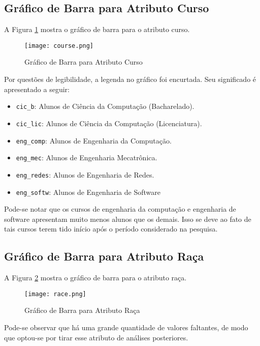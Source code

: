 \subsection{Gráfico de Barra para Atributo Curso}
A Figura \ref{atr_course} mostra o gráfico de barra para o atributo curso. 

\begin{figure}[!ht]
    \caption{Gráfico de Barra para Atributo Curso}
    \centering
    \texttt{[image: course.png]}
    \label{atr_course}
\end{figure}

Por questões de legibilidade, a legenda no gráfico foi encurtada. Seu significado é
apresentado a seguir: 
\begin{itemize}
    \item \texttt{cic\_b}: Alunos de Ciência da Computação (Bacharelado).
    \item \texttt{cic\_lic}: Alunos de Ciência da Computação (Licenciatura).
    \item \texttt{eng\_comp}: Alunos de Engenharia da Computação.
    \item \texttt{eng\_mec}: Alunos de Engenharia Mecatrônica.
    \item \texttt{eng\_redes}: Alunos de Engenharia de Redes. 
    \item \texttt{eng\_softw}: Alunos de Engenharia de Software
\end{itemize}

Pode-se notar que os cursos de engenharia da computação e engenharia de software
apresentam muito menos alunos que os demais. Isso se deve ao fato de tais cursos
terem tido início após o período considerado na pesquisa. 
\clearpage

\subsection{Gráfico de Barra para Atributo Raça}
A Figura \ref{atr_race} mostra o gráfico de barra para o atributo raça. 
\begin{figure}[!ht]
    \caption{Gráfico de Barra para Atributo Raça}
    \centering
    \texttt{[image: race.png]}
    \label{atr_race}
\end{figure}
Pode-se observar que há uma grande quantidade de valores faltantes, de modo que
optou-se por tirar esse atributo de análises posteriores. 

